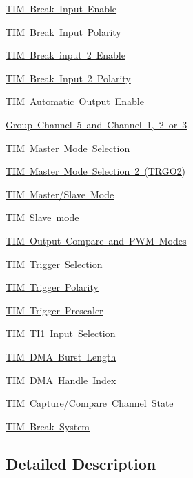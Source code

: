 \begin{DoxyCompactItemize}
\item 
\mbox{\hyperlink{group___t_i_m___break___input__enable__disable}{T\+I\+M Break Input Enable}}
\item 
\mbox{\hyperlink{group___t_i_m___break___polarity}{T\+I\+M Break Input Polarity}}
\item 
\mbox{\hyperlink{group___t_i_m___break2___input__enable__disable}{T\+I\+M Break input 2 Enable}}
\item 
\mbox{\hyperlink{group___t_i_m___break2___polarity}{T\+I\+M Break Input 2 Polarity}}
\item 
\mbox{\hyperlink{group___t_i_m___a_o_e___bit___set___reset}{T\+I\+M Automatic Output Enable}}
\item 
\mbox{\hyperlink{group___t_i_m___group___channel5}{Group Channel 5 and Channel 1, 2 or 3}}
\item 
\mbox{\hyperlink{group___t_i_m___master___mode___selection}{T\+I\+M Master Mode Selection}}
\item 
\mbox{\hyperlink{group___t_i_m___master___mode___selection__2}{T\+I\+M Master Mode Selection 2 (\+T\+R\+G\+O2)}}
\item 
\mbox{\hyperlink{group___t_i_m___master___slave___mode}{T\+I\+M Master/\+Slave Mode}}
\item 
\mbox{\hyperlink{group___t_i_m___slave___mode}{T\+I\+M Slave mode}}
\item 
\mbox{\hyperlink{group___t_i_m___output___compare__and___p_w_m__modes}{T\+I\+M Output Compare and P\+W\+M Modes}}
\item 
\mbox{\hyperlink{group___t_i_m___trigger___selection}{T\+I\+M Trigger Selection}}
\item 
\mbox{\hyperlink{group___t_i_m___trigger___polarity}{T\+I\+M Trigger Polarity}}
\item 
\mbox{\hyperlink{group___t_i_m___trigger___prescaler}{T\+I\+M Trigger Prescaler}}
\item 
\mbox{\hyperlink{group___t_i_m___t_i1___selection}{T\+I\+M T\+I1 Input Selection}}
\item 
\mbox{\hyperlink{group___t_i_m___d_m_a___burst___length}{T\+I\+M D\+M\+A Burst Length}}
\item 
\mbox{\hyperlink{group___d_m_a___handle__index}{T\+I\+M D\+M\+A Handle Index}}
\item 
\mbox{\hyperlink{group___channel___c_c___state}{T\+I\+M Capture/\+Compare Channel State}}
\item 
\mbox{\hyperlink{group___t_i_m___break___system}{T\+I\+M Break System}}
\end{DoxyCompactItemize}


\subsection{Detailed Description}
